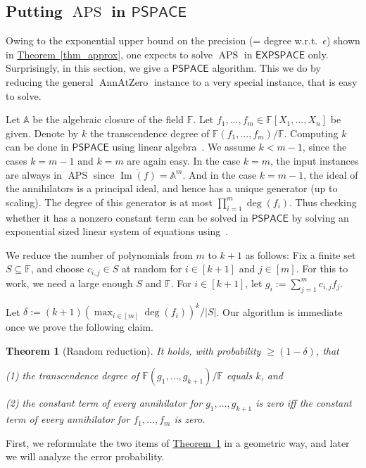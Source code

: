 \documentclass[11pt]{article}
\numberwithin{equation}{section}
\newtheorem{theorem}{Theorem}[section]
\theoremstyle{definition}
\theoremstyle{plain}
\newcommand{\cclass}[1]{\textsf{#1}}
\newcommand{\expref}[2]{\hyperref[#2]{#1~\ref{#2}}}
\newcommand{\F}{\mathbb{F}}
\newcommand{\aff}{\mathbb{A}}
\DeclareMathOperator{\im}{\mathrm{Im}}
\newcommand{\PSPACE}{\cclass{PSPACE}\xspace}  %
\newcommand{\EXPSPACE}{\cclass{EXPSPACE}\xspace} %
\DeclareMathOperator{\APS}{\mathrm{APS}\xspace} %
\DeclareMathOperator{\AnnAtZero}{\mathrm{AnnAtZero}\xspace} %
\begin{document}
\subsection{Putting \texorpdfstring{$\APS$}{APS} in \texorpdfstring{$\PSPACE$}{PSPACE}}
%

Owing to the exponential upper bound on the precision (= degree w.r.t.\ $\epsilon$) shown in \expref{Theorem}{thm_approx}, one expects to solve $\APS$ in
%
$\EXPSPACE$   %
only. Surprisingly, in this section, we give a $\PSPACE$ algorithm. This we do by reducing the general $\AnnAtZero$ instance to a very special instance, that is easy to solve.

Let $\aff$ be the algebraic closure of the field $\F$. Let $f_1,\dots,f_m\in \F[X_1,\dots,X_n]$ be given. 
Denote by $k$ the transcendence degree of $\F(f_1,\dots,f_m)/\F$. Computing $k$ can be done in $\PSPACE$ using linear algebra~\cite{Plo05,C76,BGH82, Mul87}. 
We assume $k<m-1$, since the cases $k=m-1$ and $k=m$ are again easy. In the case $k=m$, the input instances are always in $\APS$ since $\overline{\im(f)}=\aff^m$. And in the case $k=m-1$, the ideal of the annihilators is a principal ideal, and hence has a unique generator (up to scaling). The degree of this generator is at most $\prod_{i=1}^m \deg(f_i)$. Thus checking whether it has a nonzero constant term can be solved in $\PSPACE$ by solving an exponential sized linear system of equations using~\cite{C76, BGH82, Mul87}. 

We reduce the number of polynomials from $m$ to $k+1$ as follows:
Fix a finite 
%
set %
$S\subseteq \F$,  and choose $c_{i,j}\in S$ at random for $i\in [k+1]$ and $j\in [m]$. For this to work, we need a large enough $S$ and $\F$.
For $i\in [k+1]$, let $g_i:= \sum_{j=1}^m c_{i,j} f_j$. 

Let  $\delta:= (k+1)(\max_{i\in [m]}\deg(f_i))^k/|S|$. Our algorithm is immediate once we prove the following claim.
%
\begin{theorem}[Random reduction]\label{thm-randReduct}
It holds, with probability $\ge (1-\delta)$, that  

\smallskip\noindent
(1) the transcendence degree of $\F(g_1,\dots,g_{k+1})/\F$ equals $k$, and

\noindent
(2) the constant term of every annihilator for $g_1,\dots,g_{k+1}$ is zero  iff the constant term of  every annihilator for $f_1,\dots,f_{m}$ is zero.
\end{theorem}

First, we reformulate the two items of \expref{Theorem}{thm-randReduct} in a geometric way, and later we will analyze the error probability.
\end{document}
